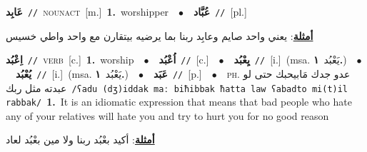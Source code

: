\documentclass[10pt,a4paper,twoside]{article} %
\begin{document}
\begin{multicols}{2}
{{\setlength\topsep{0pt}\textbf{\foreignlanguage{arabic}{عَابِد}}\ {\color{gray}\texttt{//}\color{black}}\ \textsc{noun\textunderscore act}\ [m.]\ \textbf{1.}~worshipper\ \ $\bullet$\ \ \setlength\topsep{0pt}\textbf{\foreignlanguage{arabic}{عُبَّاد}}\ {\color{gray}\texttt{//}\color{black}}\ [pl.]\  \begin{flushright}\color{gray}\foreignlanguage{arabic}{\textbf{\underline{\foreignlanguage{arabic}{أمثلة}}}: يعني واحد صايم وعابِد ربنا بما يرضيه بيتقارن مع واحد واطي خسيس}\end{flushright}\color{black}} \vspace{2mm}

{\setlength\topsep{0pt}\textbf{\foreignlanguage{arabic}{اِعْبُد}}\ {\color{gray}\texttt{//}\color{black}}\ \textsc{verb}\ [c.]\ \textbf{1.}~worship\ \ $\bullet$\ \ \setlength\topsep{0pt}\textbf{\foreignlanguage{arabic}{اُعْبُد}}\ {\color{gray}\texttt{//}\color{black}}\ [c.]\ \ $\bullet$\ \ \setlength\topsep{0pt}\textbf{\foreignlanguage{arabic}{يِعْبُد}}\ {\color{gray}\texttt{//}\color{black}}\ [i.]\ \color{gray}(msa. \foreignlanguage{arabic}{يَعْبُد}~\foreignlanguage{arabic}{\textbf{١.}})\color{black}\ \ $\bullet$\ \ \setlength\topsep{0pt}\textbf{\foreignlanguage{arabic}{يُعْبُد}}\ {\color{gray}\texttt{//}\color{black}}\ [i.]\ \color{gray}(msa. \foreignlanguage{arabic}{يَعْبُد}~\foreignlanguage{arabic}{\textbf{١.}})\color{black}\ \ $\bullet$\ \ \setlength\topsep{0pt}\textbf{\foreignlanguage{arabic}{عَبَد}}\ {\color{gray}\texttt{//}\color{black}}\ [p.]\ \ $\bullet$\ \ \textsc{ph.} \color{gray} \foreignlanguage{arabic}{عدو جدك مَابيحبك حتى لو عبدته مثل ربك}\color{black}\ {\color{gray}\texttt{/{\sffamily ʕadu (dʒ)iddak maː biħibbak ħatta law ʕabadto mi(t)il rabbak}/}\color{black}}\ \textbf{1.}~It is an idiomatic expression that means that bad people who hate any of your relatives will hate you and try to hurt you for no good reason\  \begin{flushright}\color{gray}\foreignlanguage{arabic}{\textbf{\underline{\foreignlanguage{arabic}{أمثلة}}}: أكيد بعْبُد ربنا ولا مين بعْبُد لعاد}\end{flushright}\color{black}} \vspace{2mm}

}
\end{multicols}
\end{document}
